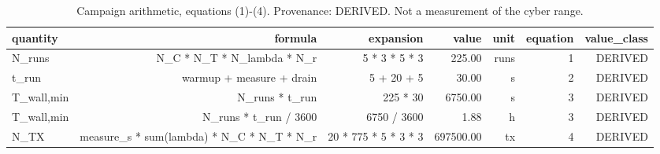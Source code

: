 \begin{table}[t]
\caption{Campaign arithmetic, equations (1)-(4). Provenance: DERIVED.  Not a measurement of the cyber range.}
\label{tab:table_campaign_arithmetic}
\centering
\begin{tabular}{lrrrrrr}
\hline
quantity & formula & expansion & value & unit & equation & value\_class \\
\hline
N\_runs & N\_C * N\_T * N\_lambda * N\_r & 5 * 3 * 5 * 3 & 225.00 & runs & 1 & DERIVED \\
t\_run & warmup + measure + drain & 5 + 20 + 5 & 30.00 & s & 2 & DERIVED \\
T\_wall,min & N\_runs * t\_run & 225 * 30 & 6750.00 & s & 3 & DERIVED \\
T\_wall,min & N\_runs * t\_run / 3600 & 6750 / 3600 & 1.88 & h & 3 & DERIVED \\
N\_TX & measure\_s * sum(lambda) * N\_C * N\_T * N\_r & 20 * 775 * 5 * 3 * 3 & 697500.00 & tx & 4 & DERIVED \\
\hline
\end{tabular}
\end{table}
